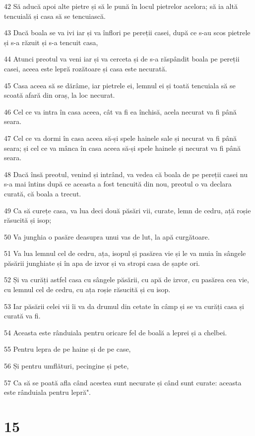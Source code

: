 \par 42 Să aducă apoi alte pietre și să le pună în locul pietrelor acelora; să ia altă tencuială și casa să se tencuiască.
\par 43 Dacă boala se va ivi iar și va înflori pe pereții casei, după ce s-au scos pietrele și s-a răzuit și s-a tencuit casa,
\par 44 Atunci preotul va veni iar și va cerceta și de s-a răspândit boala pe pereții casei, aceea este lepră rozătoare și casa este necurată.
\par 45 Casa aceea să se dărâme, iar pietrele ei, lemnul ei și toată tencuiala să se scoată afară din oraș, la loc necurat.
\par 46 Cel ce va intra în casa aceea, cât va fi ea închisă, acela necurat va fi până seara.
\par 47 Cel ce va dormi în casa aceea să-și spele hainele sale și necurat va fi până seara; și cel ce va mânca în casa aceea să-și spele hainele și necurat va fi până seara.
\par 48 Dacă însă preotul, venind și intrând, va vedea că boala de pe pereții casei nu s-a mai întins după ce aceasta a fost tencuită din nou, preotul o va declara curată, că boala a trecut.
\par 49 Ca să curețe casa, va lua deci două păsări vii, curate, lemn de cedru, ață roșie răsucită și isop;
\par 50 Va junghia o pasăre deasupra unui vas de lut, la apă curgătoare.
\par 51 Va lua lemnul cel de cedru, ața, isopul și pasărea vie și le va muia în sângele păsării junghiate și în apa de izvor și va stropi casa de șapte ori.
\par 52 Și va curăți astfel casa cu sângele păsării, cu apă de izvor, cu pasărea cea vie, cu lemnul cel de cedru, cu ața roșie răsucită și cu isop.
\par 53 Iar păsării celei vii îi va da drumul din cetate în câmp și se va curăți casa și curată va fi.
\par 54 Aceasta este rânduiala pentru oricare fel de boală a leprei și a chelbei.
\par 55 Pentru lepra de pe haine și de pe case,
\par 56 Și pentru umflături, pecingine și pete,
\par 57 Ca să se poată afla când acestea sunt necurate și când sunt curate: aceasta este rânduiala pentru lepră".

\chapter{15}

